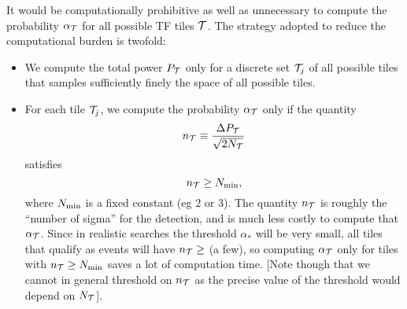 \documentclass{article}
\begin{document}
It would be computationally prohibitive as well as unnecessary to compute
the probability $\alpha_{\cal T}$ for all possible TF tiles ${\cal
T}$.  The strategy adopted to reduce the computational burden is
twofold:  
\begin{itemize}
\item We compute the total power $P_{\cal T}$ only for a discrete set
${\cal T}_j$ of all possible tiles that samples sufficiently finely
the space of all possible tiles.
\item For each tile ${\cal T}_j$, we compute the probability
$\alpha_{\cal T}$ only if the quantity
\begin{equation}
n_{\cal T} \equiv {\Delta P_{\cal T} \over \sqrt{2 N_{\cal T}}}
\label{nsigma}
\end{equation}
satisfies 
\begin{equation}
n_{\cal T} \ge N_{\rm min},
\label{firstcut}
\end{equation}
where $N_{\rm min}$ is a fixed
constant (eg 2 or 3).  The quantity $n_{\cal T}$ is 
roughly the ``number of sigma'' for the detection, and is much less costly
to compute that $\alpha_{\cal T}$.  Since in realistic searches the
threshold $\alpha_*$ will be very small, all tiles that qualify as
events will have $n_{\cal T} \ge$ (a few), so computing
$\alpha_{\cal T}$ only for tiles with $n_{\cal T} \ge N_{\rm min}$
saves a lot of computation time.  [Note though that we cannot in
general threshold on $n_{\cal T}$ as the precise value of the
threshold would depend on $N_{\cal T}$].
\end{itemize}
\end{document}
